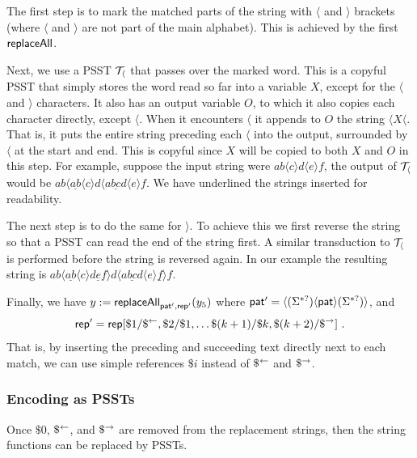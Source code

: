     The first step is to mark the matched parts of the string with $\langle$ and $\rangle$ brackets (where $\langle$ and $\rangle$ are not part of the main alphabet).
    This is achieved by the first $\mathsf{replaceAll}$.

    Next, we use a PSST $\mathcal{T}_{\langle}$ that passes over the marked word.
    This is a copyful PSST that simply stores the word read so far into a variable $X$, except for the $\langle$ and $\rangle$ characters.
    It also has an output variable $O$, to which it also copies each character directly, except $\langle$.
    When it encounters $\langle$ it appends to $O$ the string
    $\langle X \langle$.
    That is, it puts the entire string preceding each $\langle$ into the output, surrounded by $\langle$ at the start and end.
    This is copyful since $X$ will be copied to both $X$ and $O$ in this step.
    For example, suppose the input string were
    $a b \langle c \rangle d \langle e \rangle f$,
    the output of $\mathcal{T}_\langle$ would be
    $a b \langle \underline{a b} \langle c \rangle d \langle \underline{a b c d} \langle e \rangle f$.
    We have underlined the strings inserted for readability.

    The next step is to do the same for $\rangle$.
    To achieve this we first reverse the string so that a PSST can read the end of the string first.
    A similar transduction to $\mathcal{T}_\langle$ is performed before the string is reversed again.
    In our example the resulting string is
    $a b \langle \underline{a b} \langle c \rangle \underline{d e f} \rangle d \langle \underline{a b c d} \langle e \rangle \underline{f} \rangle f$.

    Finally, we have
    $y := \mathsf{replaceAll}_{\mathsf{pat}', \mathsf{rep}'}(y_5)$
    where
    $\mathsf{pat}' =
         \langle (\Sigma^{*?}) \langle
         \mathsf{pat}
         \rangle (\Sigma^{*?}) \rangle$, and
    \[
        \mathsf{rep}' = \mathsf{rep}[
            \$1 / \$^{\leftarrow},
            \$2 / \$1,
            \ldots
            \$(k+1) / \$k,
            \$(k+2) / \$^{\rightarrow}
        ] \ .
    \]
    That is, by inserting the preceding and succeeding text directly next to each match, we can use simple references $\$i$ instead of $\$^{\leftarrow}$ and $\$^{\rightarrow}$.

    \subsubsection{Encoding as PSSTs}

    Once $\$0$, $\$^{\leftarrow}$, and $\$^{\rightarrow}$ are removed from the replacement strings, then the string functions can be replaced by PSSTs.

